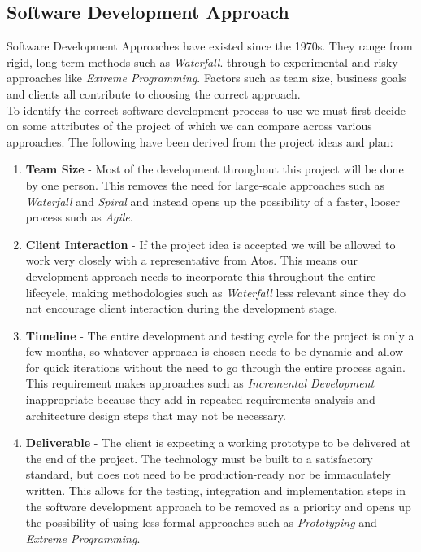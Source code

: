 \subsection{Software Development Approach}
Software Development Approaches have existed since the 1970s. They range from rigid, long-term methods such as \emph{Waterfall}. through to experimental and risky approaches like \emph{Extreme Programming}. Factors such as team size, business goals and clients all contribute to choosing the correct approach.\\
To identify the correct software development process to use we must first decide on some attributes of the project of which we can compare across various approaches. The following have been derived from the project ideas and plan:

\begin{enumerate}
  \item \textbf{Team Size} -
    Most of the development throughout this project will be done by one person. This removes the need for large-scale approaches such as \emph{Waterfall} and \emph{Spiral} and instead opens up the possibility of a faster, looser process such as \emph{Agile}.
  \item \textbf{Client Interaction} -
    If the project idea is accepted we will be allowed to work very closely with a representative from Atos. This means our development approach needs to incorporate this throughout the entire lifecycle, making methodologies such as \emph{Waterfall} less relevant since they do not encourage client interaction during the development stage.
  \item \textbf{Timeline} -
    The entire development and testing cycle for the project is only a few months, so whatever approach is chosen needs to be dynamic and allow for quick iterations without the need to go through the entire process again. This requirement makes approaches such as \emph{Incremental Development} inappropriate because they add in repeated requirements analysis and architecture design steps that may not be necessary.
  \item \textbf{Deliverable} -
    The client is expecting a working prototype to be delivered at the end of the project. The technology must be built to a satisfactory standard, but does not need to be production-ready nor be immaculately written. This allows for the testing, integration and implementation steps in the software development approach to be removed as a priority and opens up the possibility of using less formal approaches such as \emph{Prototyping} and \emph{Extreme Programming}.
\end{enumerate}
